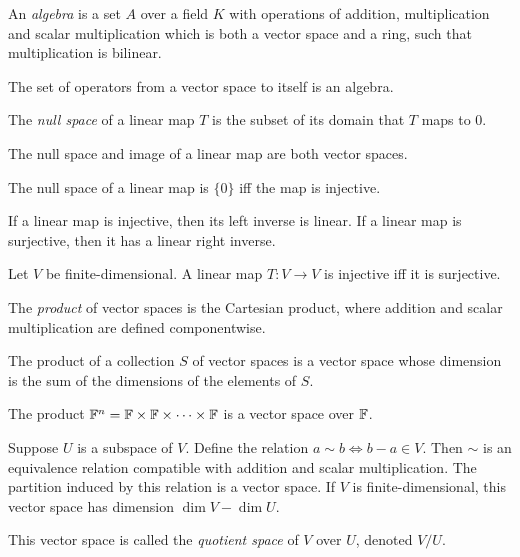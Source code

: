\begin{defn}
    An \emph{algebra} is a set $A$ over a field $K$ with operations of addition,
    multiplication and scalar multiplication which is both a vector space and a
    ring, such that multiplication is bilinear.
\end{defn}
\begin{prop}
    The set of operators from a vector space to itself is an algebra.
\end{prop}
\begin{defn}
    The \emph{null space} of a linear map $T$ is the subset of its domain that $T$
    maps to 0.
\end{defn}
\begin{prop}
    The null space and image of a linear map are both vector spaces.
\end{prop}
\begin{prop}
    The null space of a linear map is $\{0\}$ iff the map is injective.
\end{prop}
\begin{prop}
    If a linear map is injective, then its left inverse is linear. If a linear
    map is surjective, then it has a linear right inverse.
\end{prop}
\begin{prop}
    Let $V$ be finite-dimensional.
    A linear map $T:V\to V$ is injective iff it is surjective.
\end{prop}
\begin{defn}
  The \emph{product} of vector spaces is the Cartesian product, where addition
  and scalar multiplication are defined componentwise.
\end{defn}
\begin{prop}
  The product of a collection $S$ of vector spaces
  is a vector space whose dimension is the sum of the dimensions of the elements
  of $S$.
\end{prop}
\begin{cor}
  The product $\mathbb{F}^n=\mathbb{F}\times\mathbb{F}\times\cdots\times\mathbb{F}$ is a vector space over
  $\mathbb{F}$.
\end{cor}
\begin{prop}
  Suppose $U$ is a subspace of $V$. Define the relation $a\sim b\iff b-a\in V$.
  Then $\sim$ is an equivalence relation compatible with addition and scalar
  multiplication. The partition induced by this relation is a vector
  space. If $V$ is finite-dimensional, this vector space has dimension $\dim
  V-\dim U$.
\end{prop}
\begin{defn}
  This vector space is called the \emph{quotient space} of $V$ over $U$, denoted
  $V/U$.
\end{defn}
